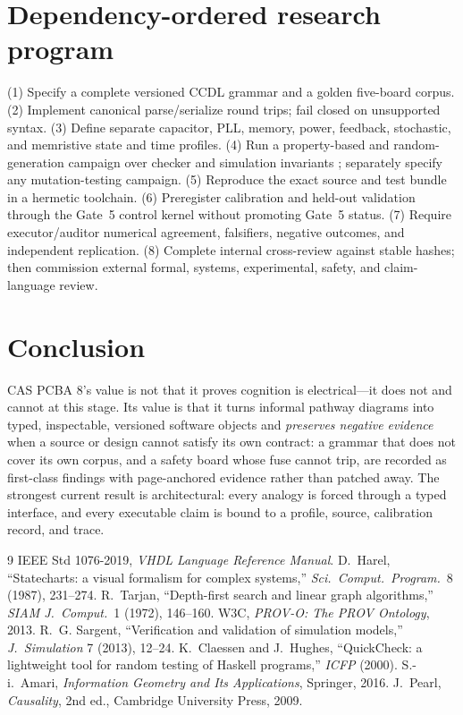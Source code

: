 \documentclass[11pt]{amsart}
\theoremstyle{definition}
\theoremstyle{remark}
\begin{document}
\section{Dependency-ordered research program}

(1) Specify a complete versioned CCDL grammar and a golden five-board corpus. (2) Implement canonical parse/serialize round trips; fail closed on unsupported syntax. (3) Define separate capacitor, PLL, memory, power, feedback, stochastic, and memristive state and time profiles. (4) Run a property-based and random-generation campaign over checker and simulation invariants \cite{quickcheck}; separately specify any mutation-testing campaign. (5) Reproduce the exact source and test bundle in a hermetic toolchain. (6) Preregister calibration and held-out validation through the Gate~5 control kernel without promoting Gate~5 status. (7) Require executor/auditor numerical agreement, falsifiers, negative outcomes, and independent replication. (8) Complete internal cross-review against stable hashes; then commission external formal, systems, experimental, safety, and claim-language review.

\section{Conclusion}

CAS PCBA 8's value is not that it proves cognition is electrical---it does not and cannot at this stage. Its value is that it turns informal pathway diagrams into typed, inspectable, versioned software objects and \emph{preserves negative evidence} when a source or design cannot satisfy its own contract: a grammar that does not cover its own corpus, and a safety board whose fuse cannot trip, are recorded as first-class findings with page-anchored evidence rather than patched away. The strongest current result is architectural: every analogy is forced through a typed interface, and every executable claim is bound to a profile, source, calibration record, and trace.

\begin{thebibliography}{9}
 IEEE Std 1076-2019, \emph{VHDL Language Reference Manual}.
 D.~Harel, ``Statecharts: a visual formalism for complex systems,'' \emph{Sci.\ Comput.\ Program.}\ 8 (1987), 231--274.
 R.~Tarjan, ``Depth-first search and linear graph algorithms,'' \emph{SIAM J.\ Comput.}\ 1 (1972), 146--160.
 W3C, \emph{PROV-O: The PROV Ontology}, 2013.
 R.~G. Sargent, ``Verification and validation of simulation models,'' \emph{J.\ Simulation} 7 (2013), 12--24.
 K.~Claessen and J.~Hughes, ``QuickCheck: a lightweight tool for random testing of Haskell programs,'' \emph{ICFP} (2000).
 S.-i.~Amari, \emph{Information Geometry and Its Applications}, Springer, 2016.
 J.~Pearl, \emph{Causality}, 2nd ed., Cambridge University Press, 2009.
\end{thebibliography}
\end{document}
